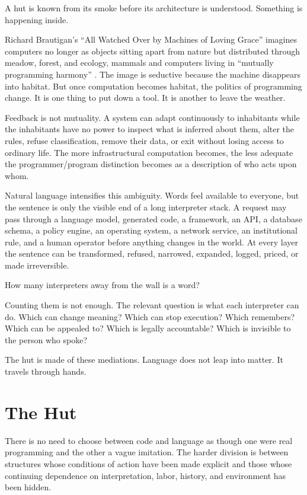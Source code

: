 \documentclass[11pt]{article}
\begin{document}
A hut is known from its smoke before its architecture is understood. Something is happening inside.

Richard Brautigan's ``All Watched Over by Machines of Loving Grace'' imagines computers no longer as objects sitting apart from nature but distributed through meadow, forest, and ecology, mammals and computers living in ``mutually programming harmony'' \cite{brautigan1967}. The image is seductive because the machine disappears into habitat. But once computation becomes habitat, the politics of programming change. It is one thing to put down a tool. It is another to leave the weather.

Feedback is not mutuality. A system can adapt continuously to inhabitants while the inhabitants have no power to inspect what is inferred about them, alter the rules, refuse classification, remove their data, or exit without losing access to ordinary life. The more infrastructural computation becomes, the less adequate the programmer/program distinction becomes as a description of who acts upon whom.

Natural language intensifies this ambiguity. Words feel available to everyone, but the sentence is only the visible end of a long interpreter stack. A request may pass through a language model, generated code, a framework, an API, a database schema, a policy engine, an operating system, a network service, an institutional rule, and a human operator before anything changes in the world. At every layer the sentence can be transformed, refused, narrowed, expanded, logged, priced, or made irreversible.

How many interpreters away from the wall is a word?

Counting them is not enough. The relevant question is what each interpreter can do. Which can change meaning? Which can stop execution? Which remembers? Which can be appealed to? Which is legally accountable? Which is invisible to the person who spoke?

The hut is made of these mediations. Language does not leap into matter. It travels through hands.

\section*{The Hut}

There is no need to choose between code and language as though one were real programming and the other a vague imitation. The harder division is between structures whose conditions of action have been made explicit and those whose continuing dependence on interpretation, labor, history, and environment has been hidden.
\end{document}
